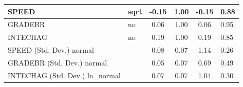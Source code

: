 \begin{table}
\begin{center}
\begin{tabular}{|l|l|c|c|c|l|}
			\hline
			SPEED & sqrt & -0.15 & 1.00 & -0.15 & 0.88 \\
			\hline
			GRADEBR & no & 0.06 & 1.00 & 0.06 & 0.95 \\
			\hline
			INTECHAG & no & 0.19 & 1.00 & 0.19 & 0.85 \\
			\hline
			SPEED (Std. Dev.) normal &  & 0.08 & 0.07 & 1.14 & 0.26 \\
			\hline
			GRADEBR (Std. Dev.) normal &  & 0.05 & 0.07 & 0.69 & 0.49 \\
			\hline
			INTECHAG (Std. Dev.) ln_normal &  & 0.07 & 0.07 & 1.04 & 0.30 \\
			\hline
		\end{tabular}
	\end{center}
\end{table}